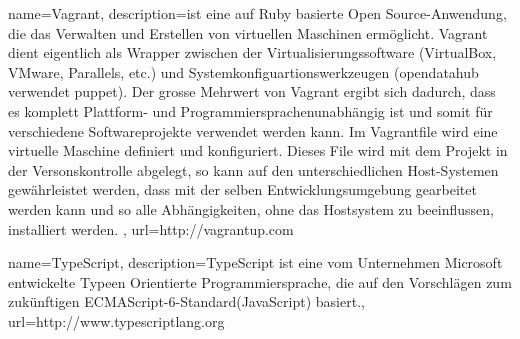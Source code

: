 

{name=Vagrant, description={ist eine auf Ruby basierte Open Source-Anwendung, die das Verwalten und Erstellen von virtuellen Maschinen ermöglicht. Vagrant dient eigentlich als Wrapper zwischen der Virtualisierungssoftware (VirtualBox, VMware, Parallels, etc.) und Systemkonfiguartionswerkzeugen (opendatahub verwendet puppet).
Der grosse Mehrwert von Vagrant ergibt sich dadurch, dass es komplett Plattform- und Programmiersprachenunabhängig ist und somit für verschiedene Softwareprojekte verwendet werden kann. Im Vagrantfile wird eine virtuelle Maschine definiert und konfiguriert. Dieses File wird mit dem Projekt in der Versonskontrolle abgelegt, so kann auf den unterschiedlichen Host-Systemen gewährleistet werden, dass mit der selben Entwicklungsumgebung gearbeitet werden kann und so alle Abhängigkeiten, ohne das Hostsystem zu beeinflussen, installiert werden. }, url={http://vagrantup.com}}

{name=TypeScript, description={TypeScript ist eine vom Unternehmen Microsoft entwickelte Typeen Orientierte Programmiersprache, die auf den Vorschlägen zum zukünftigen ECMAScript-6-Standard(JavaScript) basiert.}, url={http://www.typescriptlang.org}}









